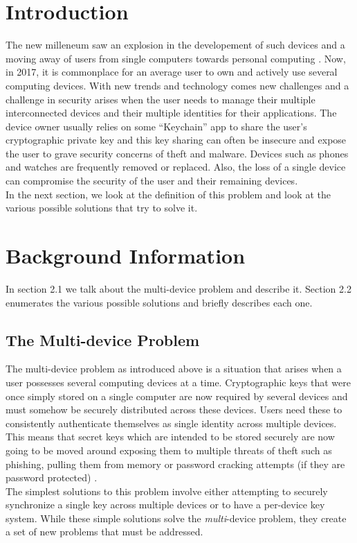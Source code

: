 \section{Introduction}

The new milleneum saw an explosion in the developement of such devices and a moving away of users from single computers towards personal computing \cite{Lyle2013}. Now, in 2017, it is commonplace for an average user to own and actively use several computing devices. With new trends and technology comes new challenges and a challenge in security arises when the user needs to manage their multiple interconnected devices and their multiple identities for their applications. The device owner usually relies on some ``Keychain'' app to share the user's cryptographic private key and this key sharing can often be insecure and expose the user to grave security concerns of theft and malware\cite{Atwater2016}. Devices such as phones and watches are frequently removed or replaced. Also, the loss of a single device can compromise the security of the user and their remaining devices.\\
In the next section, we look at the definition of this problem and look at the various possible solutions that try to solve it.

\section{Background Information}
In section 2.1 we talk about the multi-device problem and describe it. Section 2.2 enumerates the various possible solutions and briefly describes each one.

\subsection{The Multi-device Problem}
The multi-device problem as introduced above is a situation that arises when a user possesses several computing devices at a time. Cryptographic keys that were once simply stored on a single computer are now required by several devices and must somehow be securely distributed across these devices. Users need these to consistently authenticate themselves as single identity across multiple devices. This means that secret keys which are intended to be stored securely are now going to be moved around exposing them to multiple threats of theft such as phishing, pulling them from memory or password cracking attempts (if they are password protected) \cite{Atwater2016}.\\
The simplest solutions to this problem involve either attempting to securely synchronize a single key across multiple devices or to have a per-device key system. While these simple solutions solve the \emph{multi}-device problem, they create a set of new problems that must be addressed\cite{Atwater2016}.

